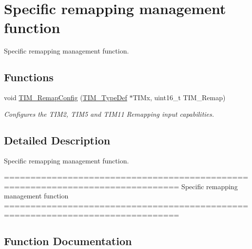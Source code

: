 \hypertarget{group___t_i_m___group9}{}\section{Specific remapping management function}
\label{group___t_i_m___group9}


Specific remapping management function.  


\subsection*{Functions}
\begin{DoxyCompactItemize}
\item 
void \hyperlink{group___t_i_m___group9_ga08ffb6f2bfa96b6fbcbb8d8001cb8ba9}{T\+I\+M\+\_\+\+Remap\+Config} (\hyperlink{struct_t_i_m___type_def}{T\+I\+M\+\_\+\+Type\+Def} $\ast$T\+I\+Mx, uint16\+\_\+t T\+I\+M\+\_\+\+Remap)
\begin{DoxyCompactList}\small\item\em Configures the T\+I\+M2, T\+I\+M5 and T\+I\+M11 Remapping input capabilities. \end{DoxyCompactList}\end{DoxyCompactItemize}


\subsection{Detailed Description}
Specific remapping management function. 

\begin{DoxyVerb} ===============================================================================
                     Specific remapping management function
 ===============================================================================  \end{DoxyVerb}
 

\subsection{Function Documentation}
